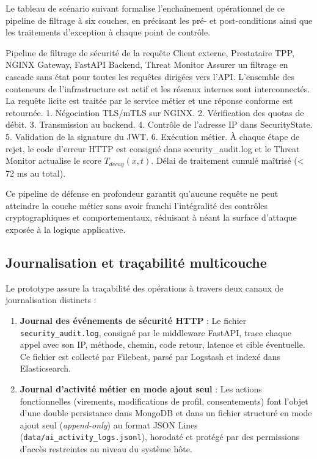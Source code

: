 Le tableau de scénario suivant formalise l'enchaînement opérationnel de ce pipeline de filtrage à six couches, en précisant les pré- et post-conditions ainsi que les traitements d'exception à chaque point de contrôle.

\scenariotable
{Pipeline de filtrage de sécurité de la requête}
{Client externe, Prestataire TPP, NGINX Gateway, FastAPI Backend, Threat Monitor}
{Assurer un filtrage en cascade sans état pour toutes les requêtes dirigées vers l'API.}
{L'ensemble des conteneurs de l'infrastructure est actif et les réseaux internes sont interconnectés.}
{La requête licite est traitée par le service métier et une réponse conforme est retournée.}
{1. Négociation TLS/mTLS sur NGINX. 2. Vérification des quotas de débit. 3. Transmission au backend. 4. Contrôle de l'adresse IP dans SecurityState. 5. Validation de la signature du JWT. 6. Exécution métier.}
{À chaque étape de rejet, le code d'erreur HTTP est consigné dans security\_audit.log et le Threat Monitor actualise le score $T_{decay}(x,t)$.}
{Délai de traitement cumulé maîtrisé (< 72 ms au total).}

Ce pipeline de défense en profondeur garantit qu'aucune requête ne peut atteindre la couche métier sans avoir franchi l'intégralité des contrôles cryptographiques et comportementaux, réduisant à néant la surface d'attaque exposée à la logique applicative.

\subsection{Journalisation et traçabilité multicouche}
Le prototype assure la traçabilité des opérations à travers deux canaux de journalisation distincts :
\begin{enumerate}[leftmargin=*]
    \item \textbf{Journal des événements de sécurité HTTP} : Le fichier \texttt{security\_audit.log}, consigné par le middleware FastAPI, trace chaque appel avec son IP, méthode, chemin, code retour, latence et cible éventuelle. Ce fichier est collecté par Filebeat, parsé par Logstash et indexé dans Elasticsearch.
    \item \textbf{Journal d'activité métier en mode ajout seul} : Les actions fonctionnelles (virements, modifications de profil, consentements) font l'objet d'une double persistance dans MongoDB et dans un fichier structuré en mode ajout seul (\textit{append-only}) au format JSON Lines (\texttt{data/ai\_activity\_logs.jsonl}), horodaté et protégé par des permissions d'accès restreintes au niveau du système hôte.
\end{enumerate}

